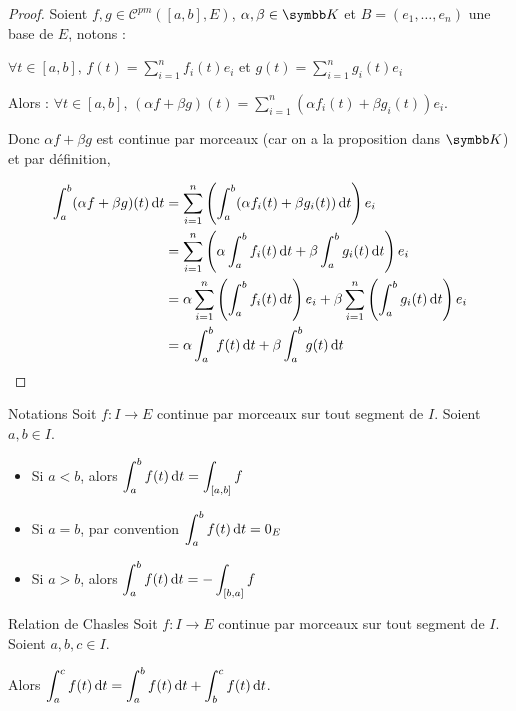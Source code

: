 \begin{proof}
    Soient $f,g \in \mathscr C^{pm}([a,b],E)$, $\alpha,\beta \in \K$ et $B = (e_1, \ldots, e_n)$ une base de $E$, notons :
    
    $\displaystyle \forall t \in [a, b], \, f(t) = \sum_{i=1}^n f_i(t)e_i$ et
    $\displaystyle g(t) = \sum_{i=1}^n g_i(t)e_i$
    
    Alors :
    $\displaystyle \forall t \in [a, b], \, (\alpha f + \beta g)(t) = \sum_{i=1}^n (\alpha f_i(t) + \beta g_i(t))e_i$.

    Donc $\alpha f + \beta g$ est continue par morceaux (car on a la proposition dans $\K$) et par définition,

    \begin{align*}
        \int_a^b (\alpha f + \beta g)(t) \,\mathrm{d}t & = \sum_{i=1}^n \left( \int_a^b (\alpha f_i(t) + \beta g_i(t)) \,\mathrm{d}t \right) e_i\\
        & = \sum_{i=1}^n \left( \alpha \int_a^b f_i(t) \,\mathrm{d}t + \beta \int_a^b g_i(t) \,\mathrm{d}t \right) e_i\\
        & = \alpha \sum_{i=1}^n \left( \int_a^b f_i(t) \,\mathrm{d}t \right) e_i + \beta \sum_{i=1}^n \left( \int_a^b g_i(t) \,\mathrm{d}t \right) e_i\\
        & = \alpha \int_a^b f(t) \,\mathrm{d}t + \beta \int_a^b g(t) \,\mathrm{d}t
    \end{align*}
\end{proof}

\begin{proposition}{Notations}{}
    Soit $f : I \to E$ continue par morceaux sur tout segment de $I$. Soient $a, b \in I$.
    \begin{itemize}
        \item Si $a < b$, alors $\displaystyle \int_a^b f(t) \,\mathrm{d}t = \int_{[a, b]} f$
        \item Si $a = b$, par convention $\displaystyle \int_a^b f(t) \,\mathrm{d}t = 0_E$
        \item Si $a > b$, alors $\displaystyle \int_a^b f(t) \,\mathrm{d}t = - \int_{[b, a]} f$
    \end{itemize}
\end{proposition}

\begin{proposition}{Relation de Chasles}{}
    Soit $f : I \to E$ continue par morceaux sur tout segment de $I$. Soient $a, b, c \in I$.

    Alors $\displaystyle \int_a^c f(t) \,\mathrm{d}t = \int_a^b f(t) \,\mathrm{d}t + \int_b^c f(t) \,\mathrm{d}t$.
\end{proposition}

